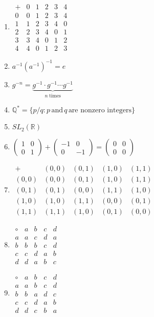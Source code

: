 \documentclass[oneside,10pt,]{article}
\begin{document}
\begin{enumerate}
\item{}\(\begin{array}{c|ccccc} + & 0 & 1 & 2 & 3 & 4 \\ \hline 0 & 0 & 1 & 2 & 3 & 4 \\ 1 & 1 & 2 & 3 & 4 & 0 \\ 2 & 2 & 3 & 4 & 0 & 1 \\ 3 & 3 & 4 & 0 & 1 & 2 \\ 4 & 4 & 0 & 1 & 2 & 3 \end{array}\)%
\item{}\(a^{-1} (a^{-1})^{-1} = e\)%
\item{}\(g^{-n} = \underbrace{g^{-1} \cdot g^{-1} \cdots g^{-1}}_{n \; \text{times}}\)%
\item{}\({\mathbb Q}^* = \{ p/q : p \, \text{and}\, q\, \text{are nonzero integers} \}\)%
\item{}\(SL_2( {\mathbb R})\)%
\item{}\(\begin{pmatrix} 1 & 0 \\ 0 & 1 \end{pmatrix} + \begin{pmatrix} -1 & 0 \\ 0 & -1 \end{pmatrix} = \begin{pmatrix} 0 & 0 \\ 0 & 0 \end{pmatrix}\)%
\item{}\(\begin{array}{c|cccc} + & (0,0) & (0,1) & (1,0) & (1,1) \\ \hline (0,0) & (0,0) & (0,1) & (1,0) & (1,1) \\ (0,1) & (0,1) & (0,0) & (1,1) & (1,0) \\ (1,0) & (1,0) & (1,1) & (0,0) & (0,1) \\ (1,1) & (1,1) & (1,0) & (0,1) & (0,0) \end{array}\)%
\item{}\(\begin{array}{c|cccc} \circ & a & b & c & d \\ \hline a & a & c & d & a \\ b & b & b & c & d \\ c & c & d & a & b \\ d & d & a & b & c \end{array}\)%
\item{}\(\begin{array}{c|cccc} \circ & a & b & c & d \\ \hline a & a & b & c & d \\ b & b & a & d & c \\ c & c & d & a & b \\ d & d & c & b & a \end{array}\)%

\end{enumerate}
\end{document}
